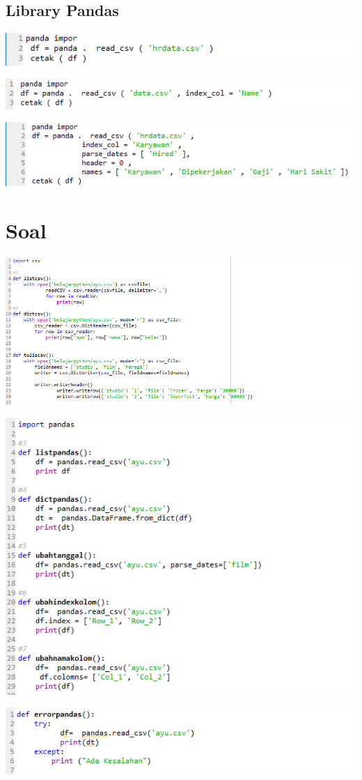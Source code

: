 \documentclass{article}
\begin{document}
\subsection{Library Pandas}

\begin{center}
    \includegraphics[width = 8cm\textwidth]{p1.png}
\end{center}

\begin{center}
    \includegraphics[width = 8cm\textwidth]{p2.png}
\end{center}

\begin{center}
    \includegraphics[width = 8cm\textwidth]{p3.png}
\end{center}

\section{Soal}

\begin{center}
    \includegraphics[width = 8cm\textwidth]{so11.png}
\end{center}

\begin{center}
    \includegraphics[width = 8cm\textwidth]{so2.png}
\end{center}

\begin{center}
    \includegraphics[width = 8cm\textwidth]{so3.png}
\end{center}
\end{document}
